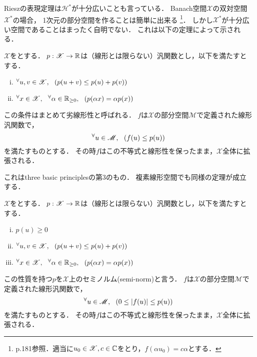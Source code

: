 \documentclass[a4j]{jsarticle}
\newcommand{\spX}{\mathscr{X}}
\begin{document}
    Rieszの表現定理は$\mathscr{H}^{\ast}$が十分広いことも言っている．
    Banach空間$\spX$の双対空間$\spX^{\ast}$の場合，
    1次元の部分空間を作ることは簡単に出来る
    \footnote{p.181参照．適当に$u_0 \in \spX, c \in \C$をとり，$f(\alpha u_0)=c \alpha$とする．}．
    しかし$\spX^{\ast}$が十分広い空間であることはまったく自明でない．
    これは以下の定理によって示される．
    \begin{Them} \label{them8:11}
        $\spX$をとする．
        $p:\spX \to \R$は（線形とは限らない）汎関数とし，以下を満たすとする．
        \begin{enumerate}[i)]
            \setlength{\leftskip}{5truemm}
        \item $\Forall{u, v \in \spX} (p(u+v) \leq p(u)+p(v))$ 
        \item $\Forall{x \in \spX} \Forall{\alpha \in \R_{\geq 0}} (p(\alpha x) = \alpha p(x))$
        \end{enumerate}
        この条件はまとめて劣線形性と呼ばれる．
        $f$は$\spX$の部分空間$\mathscr{M}$で定義された線形汎関数で，
        \[ {}^{\forall} u \in \mathscr{M},~~ (f(u) \leq p(u)) \]
        を満たすものとする．
        その時$f$はこの不等式と線形性を保ったまま，$\spX$全体に拡張される．
    \end{Them}
    これはthree basic principlesの第3のもの．
    複素線形空間でも同様の定理が成立する．

    \begin{Them}[定理8.13, p.184] \label{them8:13}
        $\spX$をとする．
        $p:\spX \to \R$は（線形とは限らない）汎関数とし，以下を満たすとする．
        \begin{enumerate}[i)]
            \setlength{\leftskip}{5truemm}
            \item $p(u) \geq 0$
            \item $\Forall{ u, v \in \spX} (p(u+v) \leq p(u)+p(v))$ 
            \item $\Forall{ x \in \spX} \Forall{\alpha \in \R_{\geq 0}} (p(\alpha x) = \alpha p(x))$
        \end{enumerate}
        この性質を持つ$p$を$\spX$上のセミノルム(semi-norm)と言う．
        $f$は$\spX$の部分空間$\mathscr{M}$で定義された線形汎関数で，
        \[ {}^{\forall} u \in \mathscr{M},~~ (0 \leq |f(u)| \leq p(u)) \]
        を満たすものとする．
        その時$f$はこの不等式と線形性を保ったまま，$\spX$全体に拡張される．
    \end{Them}
\end{document}
